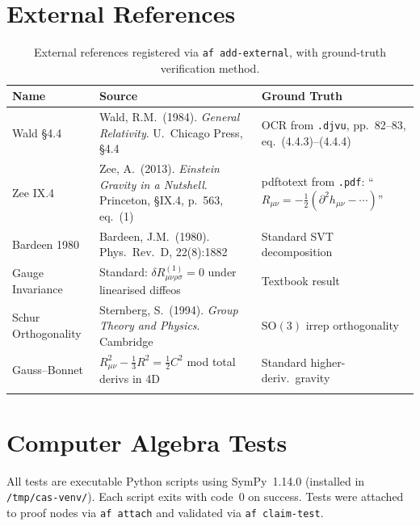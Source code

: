 \documentclass[11pt,a4paper]{article}
\newcommand{\p}{\partial}
\begin{document}
\section{External References}
\label{sec:externals}

\begin{longtable}{lp{8.5cm}p{3cm}}
\toprule
\textbf{Name} & \textbf{Source} & \textbf{Ground Truth} \\
\midrule
\endhead
Wald \S4.4 &
Wald, R.M.\ (1984). \textit{General Relativity}. U.\ Chicago Press, \S4.4 &
OCR from \texttt{.djvu}, pp.~82--83, eq.~(4.4.3)--(4.4.4) \\
Zee IX.4 &
Zee, A.\ (2013). \textit{Einstein Gravity in a Nutshell}. Princeton, \S IX.4, p.~563, eq.~(1) &
pdftotext from \texttt{.pdf}: ``$R_{\mu\nu} = -\tfrac{1}{2}(\p^2 h_{\mu\nu} - \cdots)$'' \\
Bardeen 1980 &
Bardeen, J.M.\ (1980). Phys.\ Rev.\ D, 22(8):1882 &
Standard SVT decomposition \\
Gauge Invariance &
Standard: $\delta R^{(1)}_{\mu\nu\rho\sigma} = 0$ under linearised diffeos &
Textbook result \\
Schur Orthogonality &
Sternberg, S.\ (1994). \textit{Group Theory and Physics}. Cambridge &
$\mathrm{SO}(3)$ irrep orthogonality \\
Gauss--Bonnet &
$R_{\mu\nu}^2 - \tfrac{1}{3}R^2 = \tfrac{1}{2}C^2$ mod total derivs in 4D &
Standard higher-deriv.\ gravity \\
\bottomrule
\caption{External references registered via \texttt{af add-external}, with ground-truth verification method.}
\label{tab:externals}
\end{longtable}

\section{Computer Algebra Tests}
\label{sec:tests}

All tests are executable Python scripts using SymPy~1.14.0 (installed in
\texttt{/tmp/cas-venv/}). Each script exits with code~0 on success.
Tests were attached to proof nodes via \texttt{af attach} and validated
via \texttt{af claim-test}.
\end{document}
